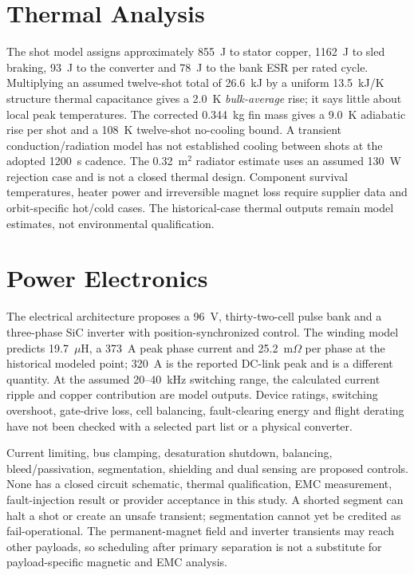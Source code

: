 \documentclass[conference]{IEEEtran}
\begin{document}
\section{Thermal Analysis}\label{sec:thermal}
The shot model assigns approximately 855~J to stator copper, 1162~J to sled braking, 93~J to the converter and 78~J to the bank ESR per rated cycle. Multiplying an assumed twelve-shot total of 26.6~kJ by a uniform 13.5~kJ/K structure thermal capacitance gives a 2.0~K \emph{bulk-average} rise; it says little about local peak temperatures. The corrected 0.344~kg fin mass gives a 9.0~K adiabatic rise per shot and a 108~K twelve-shot no-cooling bound. A transient conduction/radiation model has not established cooling between shots at the adopted 1200~s cadence. The 0.32~m$^2$ radiator estimate uses an assumed 130~W rejection case and is not a closed thermal design. Component survival temperatures, heater power and irreversible magnet loss require supplier data and orbit-specific hot/cold cases. The historical-case thermal outputs remain model estimates, not environmental qualification.

\section{Power Electronics}\label{sec:pe}
The electrical architecture proposes a 96~V, thirty-two-cell pulse bank and a three-phase SiC inverter with position-synchronized control. The winding model predicts 19.7~$\mu$H, a 373~A peak phase current and 25.2~m$\Omega$ per phase at the historical modeled point; 320~A is the reported DC-link peak and is a different quantity. At the assumed 20--40~kHz switching range, the calculated current ripple and copper contribution are model outputs. Device ratings, switching overshoot, gate-drive loss, cell balancing, fault-clearing energy and flight derating have not been checked with a selected part list or a physical converter.

Current limiting, bus clamping, desaturation shutdown, balancing, bleed/passivation, segmentation, shielding and dual sensing are proposed controls. None has a closed circuit schematic, thermal qualification, EMC measurement, fault-injection result or provider acceptance in this study. A shorted segment can halt a shot or create an unsafe transient; segmentation cannot yet be credited as fail-operational. The permanent-magnet field and inverter transients may reach other payloads, so scheduling after primary separation is not a substitute for payload-specific magnetic and EMC analysis.
\end{document}
